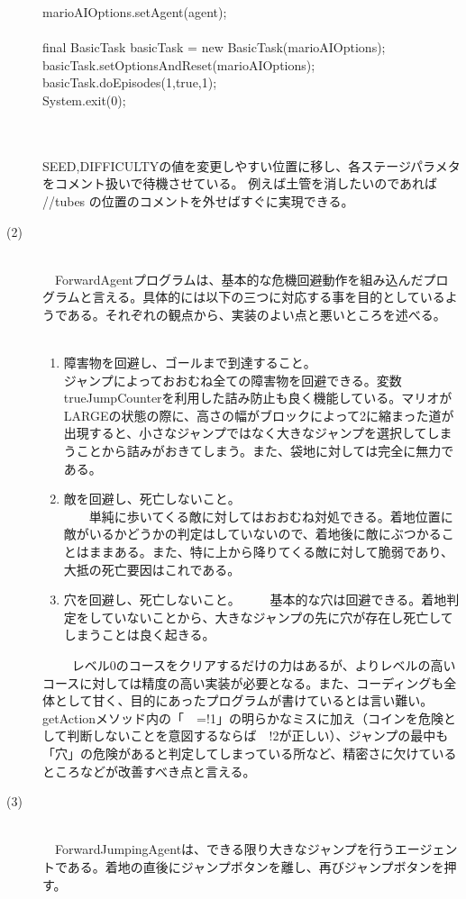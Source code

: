 \documentclass[a4j]{jarticle}
\begin{document}
\begin{description}
\begin{screen}
{{    marioAIOptions.setAgent(agent);\\
    \\
    final BasicTask basicTask = new BasicTask(marioAIOptions);\\
    basicTask.setOptionsAndReset(marioAIOptions);\\
    basicTask.doEpisodes(1,true,1);\\
    System.exit(0);\\
}\\
}\\
  \end{screen}
SEED,DIFFICULTYの値を変更しやすい位置に移し、各ステージパラメタをコメント扱いで待機させている。
例えば土管を消したいのであれば //tubes の位置のコメントを外せばすぐに実現できる。
\item[(2)]~\\
　ForwardAgentプログラムは、基本的な危機回避動作を組み込んだプログラムと言える。具体的には以下の三つに対応する事を目的としているようである。それぞれの観点から、実装のよい点と悪いところを述べる。
　\begin{enumerate}
  \item 障害物を回避し、ゴールまで到達すること。~\\
    ジャンプによっておおむね全ての障害物を回避できる。変数trueJumpCounterを利用した詰み防止も良く機能している。マリオがLARGEの状態の際に、高さの幅がブロックによって2に縮まった道が出現すると、小さなジャンプではなく大きなジャンプを選択してしまうことから詰みがおきてしまう。また、袋地に対しては完全に無力である。
　\item 敵を回避し、死亡しないこと。~\\
　　単純に歩いてくる敵に対してはおおむね対処できる。着地位置に敵がいるかどうかの判定はしていないので、着地後に敵にぶつかることはままある。また、特に上から降りてくる敵に対して脆弱であり、大抵の死亡要因はこれである。
　\item 穴を回避し、死亡しないこと。
　　基本的な穴は回避できる。着地判定をしていないことから、大きなジャンプの先に穴が存在し死亡してしまうことは良く起きる。
  \end{enumerate}
　
　レベル0のコースをクリアするだけの力はあるが、よりレベルの高いコースに対しては精度の高い実装が必要となる。また、コーディングも全体として甘く、目的にあったプログラムが書けているとは言い難い。getActionメソッド内の「~~=!1」の明らかなミスに加え（コインを危険として判断しないことを意図するならば~~!2が正しい）、ジャンプの最中も「穴」の危険があると判定してしまっている所など、精密さに欠けているところなどが改善すべき点と言える。
\item[(3)]~\\
　ForwardJumpingAgentは、できる限り大きなジャンプを行うエージェントである。着地の直後にジャンプボタンを離し、再びジャンプボタンを押す。


\end{description}
\end{document}
